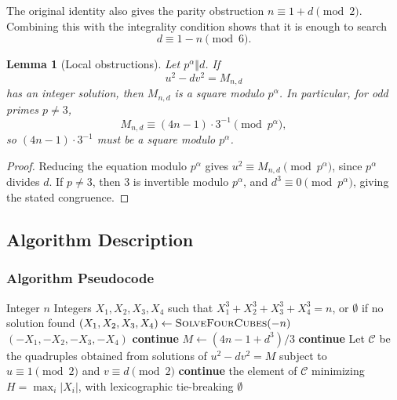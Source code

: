 \documentclass{mcom-l}
\newtheorem{lemma}[theorem]{Lemma}
\theoremstyle{definition}
\theoremstyle{remark}
\numberwithin{equation}{section}
\begin{document}
The original identity also gives the parity obstruction
$n\equiv 1+d\pmod2$.  Combining this with the integrality condition
shows that it is enough to search
\[
        d\equiv 1-n\pmod6.
\]

\begin{lemma}[Local obstructions]
\label{lem:local_obstruction}
Let $p^\alpha\Vert d$.  If
\[
        u^2-d v^2=M_{n,d}
\]
has an integer solution, then $M_{n,d}$ is a square modulo
$p^\alpha$.  In particular, for odd primes $p\neq 3$,
\[
        M_{n,d}\equiv (4n-1)\cdot 3^{-1}\pmod {p^\alpha},
\]
so $(4n-1)\cdot 3^{-1}$ must be a square modulo $p^\alpha$.
\end{lemma}

\begin{proof}
Reducing the equation modulo $p^\alpha$ gives
$u^2\equiv M_{n,d}\pmod {p^\alpha}$, since
$p^\alpha$ divides $d$.  If $p\neq3$, then $3$ is invertible modulo
$p^\alpha$, and $d^3\equiv0\pmod {p^\alpha}$, giving the stated
congruence.
\end{proof}

\subsection{Algorithm Description}
\label{subsec:algorithm}

\subsubsection{Algorithm Pseudocode}
\label{subsubsec:pseudocode}

\begin{algorithm}
\caption{SolveFourCubes}
\label{alg:main}
\begin{algorithmic}[1]
\Require Integer $n$
\Ensure Integers $X_1,X_2,X_3,X_4$ such that
$X_1^3+X_2^3+X_3^3+X_4^3=n$, or $\emptyset$ if no solution found
    \State $(X_1,X_2,X_3,X_4) \gets \textsc{SolveFourCubes}(-n)$
    \State \Return $(-X_1,-X_2,-X_3,-X_4)$
\EndIf
{}
        \State \textbf{continue}
    \EndIf
    \State $M \gets (4n - 1 + d^3)/3$
        \State \textbf{continue}
    \EndIf
    \State Let $\mathcal C$ be the quadruples obtained from solutions of
           $u^2-d v^2=M$ subject to
           $u\equiv1\pmod2$ and $v\equiv d\pmod2$
        \State \textbf{continue}
    \EndIf
    \State \Return the element of $\mathcal C$ minimizing
           $H=\max_i |X_i|$, with lexicographic tie-breaking
\EndFor
\State \Return $\emptyset$
\end{algorithmic}
\end{algorithm}
\end{document}
